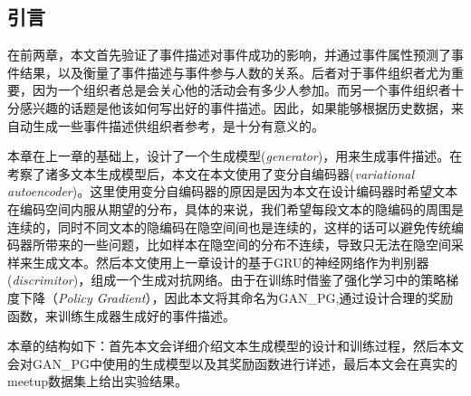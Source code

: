 % 
\subsection{引言}
在前两章，本文首先验证了事件描述对事件成功的影响，并通过事件属性预测了事件结果，以及衡量了事件描述与事件参与人数的关系。后者对于事件组织者尤为重要，因为一个组织者总是会关心他的活动会有多少人参加。而另一个事件组织者十分感兴趣的话题是他该如何写出好的事件描述。因此，如果能够根据历史数据，来自动生成一些事件描述供组织者参考，是十分有意义的。

本章在上一章的基础上，设计了一个生成模型(\textit{generator})，用来生成事件描述。在考察了诸多文本生成模型后，本文在本文使用了变分自编码器(\textit{variational autoencoder})。这里使用变分自编码器的原因是因为本文在设计编码器时希望文本在编码空间内服从期望的分布，具体的来说，我们希望每段文本的隐编码的周围是连续的，同时不同文本的隐编码在隐空间间也是连续的，这样的话可以避免传统编码器所带来的一些问题，比如样本在隐空间的分布不连续，导致只无法在隐空间采样来生成文本。然后本文使用上一章设计的基于GRU的神经网络作为判别器(\textit{discrimitor})，组成一个生成对抗网络。由于在训练时借鉴了强化学习中的策略梯度下降（\textit{Policy Gradient}），因此本文将其命名为GAN\_PG,通过设计合理的奖励函数，来训练生成器生成好的事件描述。

本章的结构如下：首先本文会详细介绍文本生成模型的设计和训练过程，然后本文会对GAN\_PG中使用的生成模型以及其奖励函数进行详述，最后本文会在真实的meetup数据集上给出实验结果。

